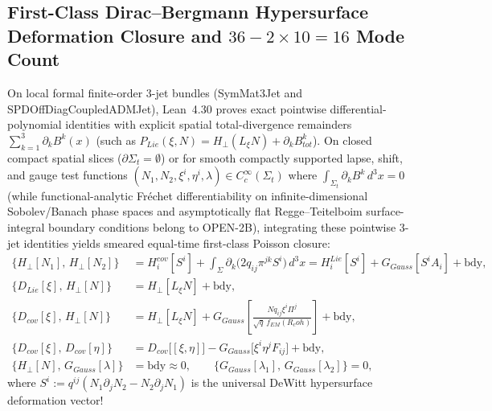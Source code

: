 \documentclass[american,11pt,letterpaper]{article}
\newcommand{\Rcoh}{R_{\mathrm{coh}}}
\def\mathcal#1{#1}%
\def\mathrm#1{#1}%
\def\texttt#1{#1}%
\def\Rcoh{R_coh}%
\begin{document}
\subsection{First-Class Dirac--Bergmann Hypersurface Deformation Closure and $36 - 2\times 10 = 16$ Mode Count}

On local formal finite-order 3-jet bundles (\texttt{SymMat3Jet} and \texttt{SPDOff\allowbreak{}Diag\allowbreak{}Coupled\allowbreak{}ADMJet}), Lean~4.30 proves exact pointwise differential-polynomial identities with explicit spatial total-divergence remainders $\sum_{k=1}^3\partial_k B^k(x)$ (such as $\mathcal{P}_{\mathrm{Lie}}(\xi, N) = \mathcal{H}_\perp(\mathcal{L}_\xi N) + \partial_k B_{\mathrm{tot}}^k$). On closed compact spatial slices ($\partial\Sigma_t = \emptyset$) or for smooth compactly supported lapse, shift, and gauge test functions $(N_1, N_2, \xi^i, \eta^i, \lambda) \in C_c^\infty(\Sigma_t)$ where $\int_{\Sigma_t}\partial_k B^k\,d^3x = 0$ (while functional-analytic Fr\'echet differentiability on infinite-dimensional Sobolev/Banach phase spaces and asymptotically flat Regge--Teitelboim surface-integral boundary conditions belong to \texttt{OPEN-2B}), integrating these pointwise 3-jet identities yields smeared equal-time first-class Poisson closure:
\begin{align}
\bigl\{\mathcal{H}_\perp[N_1],\,\mathcal{H}_\perp[N_2]\bigr\}
&= \mathcal{H}_i^{\mathrm{cov}}[S^i] + \int_{\Sigma} \partial_k\bigl(2 q_{ij}\pi^{jk} S^i\bigr)\,d^3x
= \mathcal{H}_i^{\mathrm{Lie}}[S^i] + G_{\mathrm{Gauss}}[S^i A_i] + \text{bdy}, \label{eq:pb_H_H}\\
\bigl\{\mathcal{D}_{\mathrm{Lie}}[\xi],\,\mathcal{H}_\perp[N]\bigr\}
&= \mathcal{H}_\perp[\mathcal{L}_\xi N] + \text{bdy}, \label{eq:pb_DLie_H}\\
\bigl\{\mathcal{D}_{\mathrm{cov}}[\xi],\,\mathcal{H}_\perp[N]\bigr\}
&= \mathcal{H}_\perp[\mathcal{L}_\xi N] + G_{\mathrm{Gauss}}\!\left[\frac{N q_{ij}\xi^i\Pi^j}{\sqrt{q}\,f_{\mathrm{EM}}(\Rcoh)}\right] + \text{bdy}, \label{eq:pb_Dcov_H}\\
\bigl\{\mathcal{D}_{\mathrm{cov}}[\xi],\,\mathcal{D}_{\mathrm{cov}}[\eta]\bigr\}
&= \mathcal{D}_{\mathrm{cov}}\bigl[[\xi,\eta]\bigr] - G_{\mathrm{Gauss}}\bigl[\xi^i\eta^j F_{ij}\bigr] + \text{bdy}, \label{eq:pb_Dcov_Dcov}\\
\bigl\{\mathcal{H}_\perp[N],\,G_{\mathrm{Gauss}}[\lambda]\bigr\} &= \text{bdy} \approx 0,
\qquad
\bigl\{G_{\mathrm{Gauss}}[\lambda_1],\,G_{\mathrm{Gauss}}[\lambda_2]\bigr\} = 0, \label{eq:pb_H_G}
\end{align}
where $S^i := q^{ij}(N_1\partial_j N_2 - N_2\partial_j N_1)$ is the universal DeWitt hypersurface deformation vector!
\end{document}
